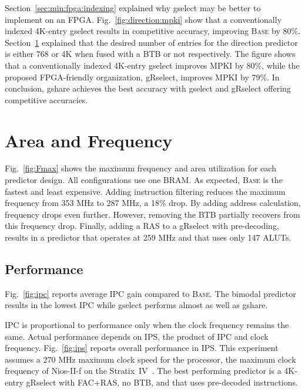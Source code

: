 Section~\ref{sec:min:fpga:indexing} explained why gselect may be better to implement on an FPGA. Fig.~\ref{fig:direction:mpki} show that a conventionally indexed 4K-entry gselect results in competitive accuracy, improving \textsc{Base} by 80\%. Section~\ref{sec:eval:min:fmax} explained that the desired number of entries for the direction predictor is either 768 or 4K when fused with a BTB or not respectively. The figure shows that a conventionally indexed 4K-entry gselect improves MPKI by 80\%, while the proposed FPGA-friendly organization, gRselect, improves MPKI by 79\%. In conclusion, gshare achieves the best accuracy with gselect and gRselect offering competitive accuracies.

\section{Area and Frequency}
\label{sec:eval:min:fmax}
Fig.~\ref{fig:Fmax} shows the maximum frequency and area utilization for each predictor design. All configurations use one BRAM. As expected, \textsc{Base} is the fastest and least expensive. Adding instruction filtering reduces the maximum frequency from 353 MHz to 287 MHz, a 18\% drop. By adding address calculation, frequency drops even further. However, removing the BTB partially recovers from this frequency drop. Finally, adding a RAS to a gRselect with pre-decoding, results in a predictor that operates at 259 MHz and that uses only 147 ALUTs.

\subsection{Performance}
\label{sec:eval:performance}
Fig.~\ref{fig:ipc} reports  average IPC gain compared to \textsc{Base}. The bimodal predictor results in the lowest IPC  while gselect performs almost as well as gshare.

IPC is proportional to performance only when the clock frequency remains the same. Actual performance depends  on IPS, the product of IPC and clock frequency. Fig.~\ref{fig:ips} reports overall performance in IPS. This experiment assumes a 270 MHz maximum clock speed for the processor, the maximum clock frequency of Nios-II-f on the Stratix~IV~\cite{niosfmax}. The best performing predictor is a 4K-entry gRselect with FAC+RAS, no BTB, and that uses pre-decoded instructions.



